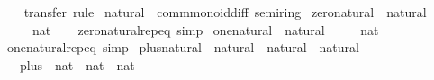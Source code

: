 \begin{isabellebody}
%
\isadelimproof
\ \ %
\endisadelimproof
%
\isatagproof
{}\isamarkupfalse%
\ transfer\ rule%
\endisatagproof
{\isafoldproof}%
%
\isadelimproof
\isanewline
%
\endisadelimproof
\isanewline
{}\isamarkupfalse%
\ natural\ {\isacharcolon}{\kern0pt}{\isacharcolon}{\kern0pt}\ {\isachardoublequoteopen}{\isacharbraceleft}{\kern0pt}comm{\isacharunderscore}{\kern0pt}monoid{\isacharunderscore}{\kern0pt}diff{\isacharcomma}{\kern0pt}\ semiring{\isacharunderscore}{\kern0pt}{}{\isacharbraceright}{\kern0pt}{\isachardoublequoteclose}\isanewline
{}\isanewline
\isanewline
{}\isamarkupfalse%
\ zero{\isacharunderscore}{\kern0pt}natural\ {\isacharcolon}{\kern0pt}{\isacharcolon}{\kern0pt}\ natural\isanewline
\ \ \ {\isachardoublequoteopen}{}\ {\isacharcolon}{\kern0pt}{\isacharcolon}{\kern0pt}\ nat{\isachardoublequoteclose}\isanewline
%
\isadelimproof
\ \ %
\endisadelimproof
%
\isatagproof
\isacommand{{\isachardot}{\kern0pt}}\isamarkupfalse%
%
\endisatagproof
{\isafoldproof}%
%
\isadelimproof
\isanewline
%
\endisadelimproof
\isanewline
{}\isamarkupfalse%
\ zero{\isacharunderscore}{\kern0pt}natural{\isachardot}{\kern0pt}rep{\isacharunderscore}{\kern0pt}eq\ {\isacharbrackleft}{\kern0pt}simp{\isacharbrackright}{\kern0pt}\isanewline
\isanewline
{}\isamarkupfalse%
\ one{\isacharunderscore}{\kern0pt}natural\ {\isacharcolon}{\kern0pt}{\isacharcolon}{\kern0pt}\ natural\isanewline
\ \ \ {\isachardoublequoteopen}{}\ {\isacharcolon}{\kern0pt}{\isacharcolon}{\kern0pt}\ nat{\isachardoublequoteclose}\isanewline
%
\isadelimproof
\ \ %
\endisadelimproof
%
\isatagproof
\isacommand{{\isachardot}{\kern0pt}}\isamarkupfalse%
%
\endisatagproof
{\isafoldproof}%
%
\isadelimproof
\isanewline
%
\endisadelimproof
\isanewline
{}\isamarkupfalse%
\ one{\isacharunderscore}{\kern0pt}natural{\isachardot}{\kern0pt}rep{\isacharunderscore}{\kern0pt}eq\ {\isacharbrackleft}{\kern0pt}simp{\isacharbrackright}{\kern0pt}\isanewline
\isanewline
{}\isamarkupfalse%
\ plus{\isacharunderscore}{\kern0pt}natural\ {\isacharcolon}{\kern0pt}{\isacharcolon}{\kern0pt}\ {\isachardoublequoteopen}natural\ {\isasymRightarrow}\ natural\ {\isasymRightarrow}\ natural{\isachardoublequoteclose}\isanewline
\ \ \ {\isachardoublequoteopen}plus\ {\isacharcolon}{\kern0pt}{\isacharcolon}{\kern0pt}\ nat\ {\isasymRightarrow}\ nat\ {\isasymRightarrow}\ nat{\isachardoublequoteclose}\isanewline

\end{isabellebody}
